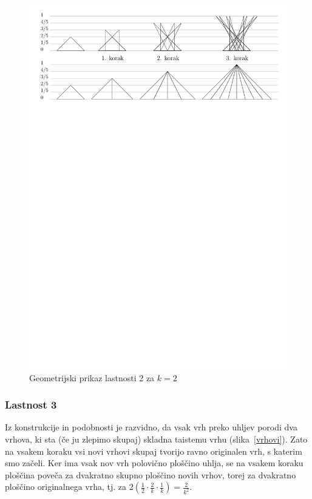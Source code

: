 \documentclass[a4paper, 12pt]{article}
\begin{document}
\begin{figure}[h!]
    \centering
    \includegraphics[width=\textwidth]{ipe_slike/lastnost2.pdf}
    \caption{Geometrijski prikaz lastnosti 2 za $ k = 2 $}
    \label{lastnost2}
\end{figure}


\subsubsection*{Lastnost 3}

Iz konstrukcije in podobnosti je razvidno, da vsak vrh preko uhljev porodi dva vrhova, ki sta (če ju zlepimo skupaj) skladna taistemu vrhu (slika~\ref{vrhovi}). Zato na vsakem koraku vsi novi vrhovi skupaj tvorijo ravno originalen vrh, s katerim smo začeli. Ker ima vsak nov vrh polovično ploščino uhlja, se na vsakem koraku ploščina poveča za dvakratno skupno ploščino novih vrhov, torej za dvakratno ploščino originalnega vrha, tj. za $ 2 \left( \frac{1}{2} \cdot \frac{2}{k} \cdot \frac{1}{k} \right) = \frac{2}{k^2} $.
\end{document}
